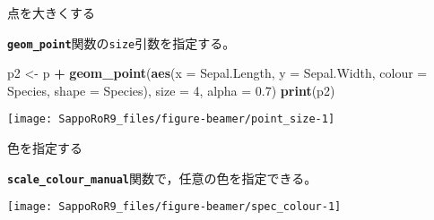 \documentclass[ignorenonframetext,]{beamer}
\newenvironment{Shaded}{\begin{snugshade}}{\end{snugshade}}
\newcommand{\KeywordTok}[1]{\textcolor[rgb]{0.13,0.29,0.53}{\textbf{#1}}}
\newcommand{\DataTypeTok}[1]{\textcolor[rgb]{0.13,0.29,0.53}{#1}}
\newcommand{\DecValTok}[1]{\textcolor[rgb]{0.00,0.00,0.81}{#1}}
\newcommand{\FloatTok}[1]{\textcolor[rgb]{0.00,0.00,0.81}{#1}}
\newcommand{\StringTok}[1]{\textcolor[rgb]{0.31,0.60,0.02}{#1}}
\newcommand{\OperatorTok}[1]{\textcolor[rgb]{0.81,0.36,0.00}{\textbf{#1}}}
\newcommand{\NormalTok}[1]{#1}
\let\oldShaded\Shaded
\let\endoldShaded\endShaded
\renewenvironment{Shaded}{\footnotesize\oldShaded}{\endoldShaded}
\begin{document}
\begin{frame}[fragile]{点を大きくする}

\textbf{\texttt{geom\_point}}関数の\texttt{size}引数を指定する。

\begin{Shaded}
\begin{Highlighting}[]
\NormalTok{p2 <-}\StringTok{ }\NormalTok{p }\OperatorTok{+}\StringTok{ }\KeywordTok{geom_point}\NormalTok{(}\KeywordTok{aes}\NormalTok{(}\DataTypeTok{x =}\NormalTok{ Sepal.Length, }\DataTypeTok{y =}\NormalTok{ Sepal.Width,}
                         \DataTypeTok{colour =}\NormalTok{ Species, }\DataTypeTok{shape =}\NormalTok{ Species),}
                     \DataTypeTok{size =} \DecValTok{4}\NormalTok{, }\DataTypeTok{alpha =} \FloatTok{0.7}\NormalTok{)}
\KeywordTok{print}\NormalTok{(p2)}
\end{Highlighting}
\end{Shaded}

\texttt{[image: SappoRoR9\_files/figure-beamer/point\_size-1]}

\end{frame}

\begin{frame}[fragile]{色を指定する}

\textbf{\texttt{scale\_colour\_manual}}関数で，任意の色を指定できる。

\begin{Shaded}
\end{Shaded}

\texttt{[image: SappoRoR9\_files/figure-beamer/spec\_colour-1]}

\end{frame}
\end{document}
